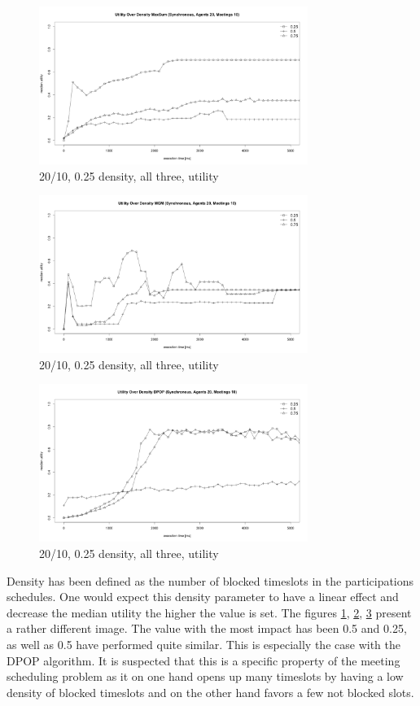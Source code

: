 \begin{figure}[H]
\centering
\includegraphics[width=330px]{graphics/experiments/static/st_5}
\caption{20/10, 0.25 density, all three, utility}
\label{fig:st_5}
\end{figure}
\begin{figure}[H]
\centering
\includegraphics[width=330px]{graphics/experiments/static/st_6}
\caption{20/10, 0.25 density, all three, utility}
\label{fig:st_6}
\end{figure}
\begin{figure}[H]
\centering
\includegraphics[width=330px]{graphics/experiments/static/st_7}
\caption{20/10, 0.25 density, all three, utility}
\label{fig:st_7}
\end{figure}

Density has been defined as the number of blocked timeslots in the participations schedules. One would expect this density parameter to have a linear effect and decrease the median utility the higher the value is set. The figures \ref{fig:st_5}, \ref{fig:st_6}, \ref{fig:st_7}  present a rather different image. The value with the most impact has been 0.5 and 0.25, as well as 0.5 have performed quite similar. This is especially the case with the DPOP algorithm. It is suspected that this is a specific property of the meeting scheduling problem as it on one hand opens up many timeslots by having a low density of blocked timeslots and on the other hand favors a few not blocked slots.


